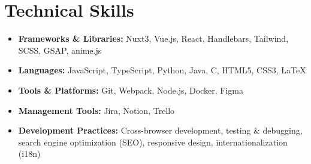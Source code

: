 \section*{Technical Skills}
%
%
%
\begin{itemize}
  \item \textbf{Frameworks \& Libraries:} Nuxt3, Vue.js, React, Handlebars, Tailwind, SCSS, GSAP, anime.js
  \item \textbf{Languages:} JavaScript, TypeScript, Python, Java, C, HTML5, CSS3, LaTeX
  \item \textbf{Tools \& Platforms:} Git, Webpack, Node.js, Docker, Figma
  \item \textbf{Management Tools:} Jira, Notion, Trello
  \item \textbf{Development Practices:} Cross-browser development, testing \& debugging, search engine optimization (SEO), responsive design, internationalization (i18n)
\end{itemize}